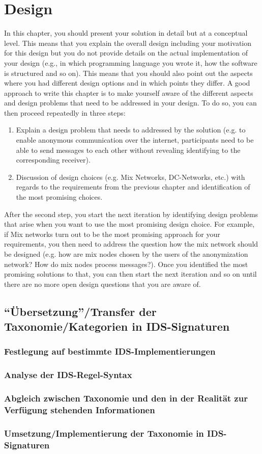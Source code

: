 \chapter{Design}%
\label{cha:design}

In this chapter, you should present your solution in detail but at a conceptual level. This means that you explain the overall design including your motivation for this design but you do not provide details on the actual implementation of your design (e.g., in which programming language you wrote it, how the software is structured and so on). This means that you should also point out the aspects where you had different design options and in which points they differ. A good approach to write this chapter is to make yourself aware of the different aspects and design problems that need to be addressed in your design. To do so, you can then proceed repeatedly in three steps:
\begin{enumerate}
   \item Explain a design problem that needs to addressed by the solution (e.g. to enable anonymous communication over the internet, participants need to be able to send messages to each other without revealing identifying to the corresponding receiver).
   \item Discussion of design choices (e.g. Mix Networks, DC-Networks, etc.) with regards to the requirements from the previous chapter and identification of the most promising choices.
\end{enumerate}
After the second step, you start the next iteration by identifying design problems that arise when you want to use the most promising design choice. For example, if Mix networks turn out to be the most promising approach for your requirements, you then need to address the question how the mix network should be designed (e.g. how are mix nodes chosen by the users of the anonymization network? How do mix nodes process messages?). Once you identified the most promising solutions to that, you can then start the next iteration and so on until there are no more open design questions that you are aware of.

\section{“Übersetzung”/Transfer der Taxonomie/Kategorien in IDS-Signaturen} 

		\subsection{ Festlegung auf bestimmte IDS-Implementierungen}
		\subsection{ Analyse der IDS-Regel-Syntax  }
		\subsection{ Abgleich zwischen Taxonomie und den in der Realität zur Verfügung stehenden Informationen}
		\subsection{ Umsetzung/Implementierung der Taxonomie in  IDS-Signaturen}
